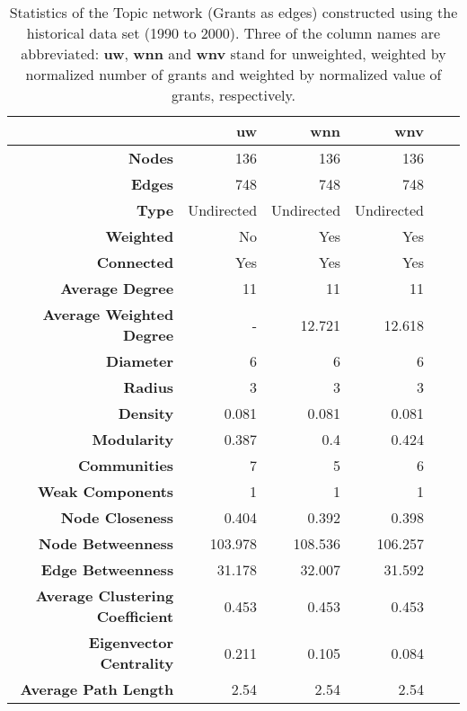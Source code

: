 \begin{table}[!htbp]
\centering
\caption[Statistics of the Topic network (Grants as edges) constructed using the historical data set (1990 to 2000)]{Statistics of the Topic network (Grants as edges) constructed using the historical data set (1990 to 2000). Three of the column names are abbreviated: \textbf{uw}, \textbf{wnn} and \textbf{wnv} stand for unweighted, weighted by normalized number of grants and weighted by normalized value of grants, respectively.}
\label{table:topic_a_historical2_stats_appendix}
\begin{tabular}{r|rrrrr}
{} & \textbf{uw} & \textbf{wnn} & \textbf{wnv}\\
\hline
\textbf{Nodes} & {136} & {136} & {136}\\
\textbf{Edges} & {748} & {748} & {748}\\
\textbf{Type} & {Undirected} & {Undirected} & {Undirected}\\
\textbf{Weighted} & {No} & {Yes} & {Yes}\\
\textbf{Connected} & {Yes} & {Yes} & {Yes}\\
\textbf{Average Degree} & {11} & {11} & {11}\\
\textbf{Average Weighted Degree} & {-} & {12.721} & {12.618}\\
\textbf{Diameter} & {6} & {6} & {6}\\
\textbf{Radius} & {3} & {3} & {3}\\
\textbf{Density} & {0.081} & {0.081} & {0.081}\\
\textbf{Modularity} & {0.387} & {0.4} & {0.424}\\
\textbf{Communities} & {7} & {5} & {6}\\
\textbf{Weak Components} & {1} & {1} & {1}\\
\textbf{Node Closeness} & {0.404} & {0.392} & {0.398}\\
\textbf{Node Betweenness} & {103.978} & {108.536} & {106.257}\\
\textbf{Edge Betweenness} & {31.178} & {32.007} & {31.592}\\
\textbf{Average Clustering Coefficient} & {0.453} & {0.453} & {0.453}\\
\textbf{Eigenvector Centrality} & {0.211} & {0.105} & {0.084}\\
\textbf{Average Path Length} & {2.54} & {2.54} & {2.54}
\end{tabular}
\end{table}

